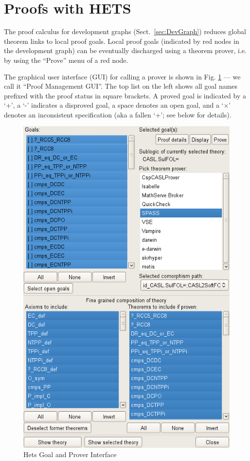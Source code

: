 \documentclass{article}
\newcommand{\normalTEXTSC}[2]{{#1\scriptsize#2}}
\newcommand     {\Hets}{\normalTEXTSC{H}{ETS}\xspace}
\begin{document}
\section{Proofs with \Hets}\label{sec:Proofs}

The proof calculus for development graphs (Sect.~\ref{sec:DevGraph}) reduces
global theorem links to local proof goals. Local proof goals (indicated by red
nodes in the development graph) can be eventually discharged using a theorem
prover, i.e. by using the ``Prove'' menu of a red node.

The graphical user interface (GUI) for calling a prover is shown in
Fig. \ref{fig:proof_window} --- we call it ``Proof Management GUI''.
The top list on the left shows all goal names prefixed with the proof
status in square brackets. A proved goal is indicated by a `+', a `-'
indicates a disproved goal, a space denotes an open goal, and a
`$\times$' denotes an inconsistent specification (aka a fallen `+';
see below for details).

\begin{figure}
\centering
\includegraphics[width=\textwidth]{proofmanagement1}
\caption{Hets Goal and Prover Interface\label{fig:proof_window}}
\end{figure}
\end{document}
